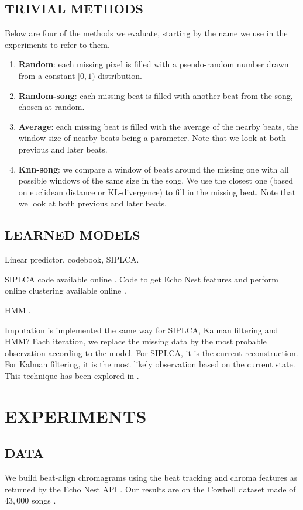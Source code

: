 \documentclass{article}
\begin{document}
\subsection{TRIVIAL METHODS}
\label{ssec:trivialmethods}
Below are four of the methods we evaluate, starting by the name we use in the experiments
to refer to them.
\begin{enumerate}
\item \textbf{Random}: each missing pixel is filled with a pseudo-random number drawn from
a constant $[0,1)$ distribution.
\item \textbf{Random-song}: each missing beat is filled with another beat from the song,
chosen at random.
\item \textbf{Average}: each missing beat is filled with the average of the nearby beats,
the window size of nearby beats being a parameter. Note that we look at both previous and
later beats.
\item \textbf{Knn-song}: we compare a window of beats around the missing one with
all possible windows of the same size in the song. We use the closest one (based on euclidean
distance or KL-divergence) to fill in the missing beat. Note that we look at both
previous and later beats.
\end{enumerate}

\subsection{LEARNED MODELS}
\label{ssec:learnedmodels}

Linear predictor, codebook, SIPLCA.

SIPLCA code available online \cite{Weiss2010}. Code to get Echo Nest features and perform
online clustering available online \cite{Bertin-Mahieux2010a}.

HMM \cite{Rabiner1989}.

Imputation is implemented the same way for SIPLCA, Kalman filtering and HMM? Each iteration,
we replace the missing data by the most probable observation according to the model.
For SIPLCA, it is the current reconstruction. For Kalman filtering, it is the most likely
observation based on the current state. This technique has been explored in \cite{Zhang2006}.


\section{EXPERIMENTS}
\label{sec:experiments}

\subsection{DATA}
\label{ssec:data}
We build beat-align chromagrams using the beat tracking and chroma features as
returned by the Echo Nest API \cite{EchoNest}. Our results are on the Cowbell
dataset made of $43,000$ songs \cite{Bertin-Mahieux2010a}.
\end{document}
